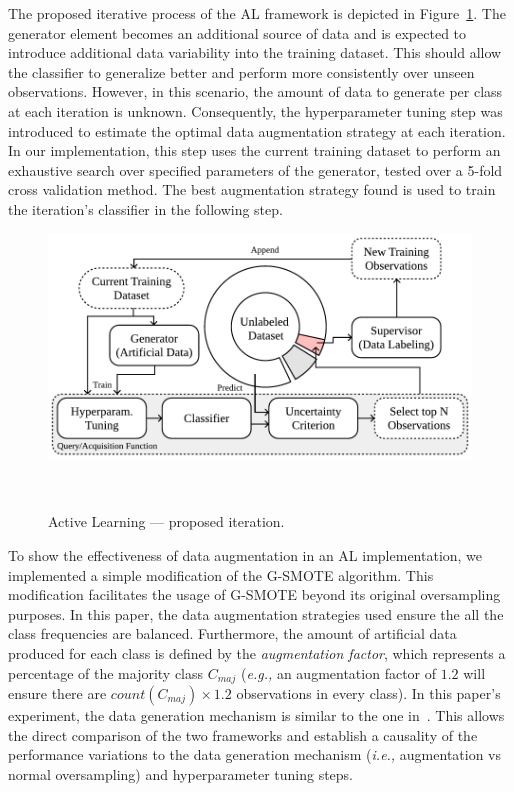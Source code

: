 \documentclass[parskip=full]{scrartcl}
\begin{document}
The proposed iterative process of the AL framework is depicted in
Figure~\ref{fig:al_proposed}. The generator element becomes an additional
source of data and is expected to introduce additional data variability into
the training dataset. This should allow the classifier to generalize better
and perform more consistently over unseen observations. However, in this
scenario, the amount of data to generate per class at each iteration is
unknown. Consequently, the hyperparameter tuning step was introduced to
estimate the optimal data augmentation strategy at each iteration. In our
implementation, this step uses the current training dataset to perform an
exhaustive search over specified parameters of the generator, tested over a
5-fold cross validation method. The best augmentation strategy found is used
to train the iteration's classifier in the following step.

\begin{figure}[H]
	\centering
	\includegraphics[width=.75\linewidth]{../analysis/al_proposed}
    \caption{%
        Active Learning --- proposed iteration.
    }~\label{fig:al_proposed}
\end{figure}

To show the effectiveness of data augmentation in an AL implementation, we
implemented a simple modification of the G-SMOTE algorithm. This modification
facilitates the usage of G-SMOTE beyond its original oversampling purposes. In
this paper, the data augmentation strategies used ensure the all the class
frequencies are balanced. Furthermore, the amount of artificial data produced
for each class is defined by the \textit{augmentation factor}, which
represents a percentage of the majority class $C_{maj}$ (\textit{e.g.,} an
augmentation factor of $1.2$ will ensure there are $count(C_{maj}) \times 1.2$
observations in every class). In this paper's experiment, the data generation
mechanism is similar to the one in~\cite{Fonseca2021}. This allows the direct
comparison of the two frameworks and establish a causality of the performance
variations to the data generation mechanism (\textit{i.e.,} augmentation vs
normal oversampling) and hyperparameter tuning steps.
\end{document}
